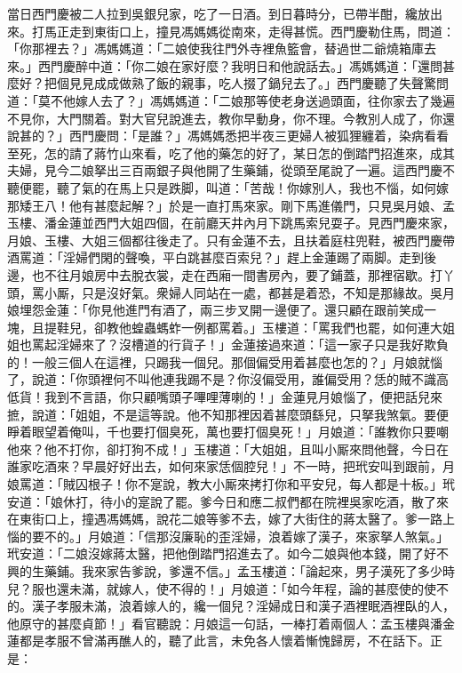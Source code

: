 當日西門慶被二人拉到吳銀兒家，吃了一日酒。到日暮時分，已帶半酣，纔放出來。打馬正走到東街口上，撞見馮媽媽從南來，走得甚慌。西門慶勒住馬，問道：「你那裡去？」馮媽媽道：「二娘使我往門外寺裡魚籃會，替過世二爺燒箱庫去來。」西門慶醉中道：「你二娘在家好麼？我明日和他說話去。」{}馮媽媽道：「還問甚麼好？把個見見成成做熟了飯的親事，吃人掇了鍋兒去了。」西門慶聽了失聲驚問道：「莫不他嫁人去了？」馮媽媽道：「二娘那等使老身送過頭面，往你家去了幾遍不見你，大門關着。對大官兒說進去，教你早動身，你不理。今教別人成了，你還說甚的？」西門慶問：「是誰？」馮媽媽悉把半夜三更婦人被狐狸纏着，染病看看至死，怎的請了蔣竹山來看，吃了他的藥怎的好了，某日怎的倒踏門招進來，成其夫婦，見今二娘拏出三百兩銀子與他開了生藥鋪，從頭至尾說了一遍。這西門慶不聽便罷，聽了氣的在馬上只是跌脚，叫道：「苦哉！你嫁別人，我也不惱，如何嫁那矮王八！他有甚麼起解？」於是一直打馬來家。剛下馬進儀門，只見吳月娘、孟玉樓、潘金蓮並西門大姐四個，在前廳天井內月下跳馬索兒耍子。見西門慶來家，月娘、玉樓、大姐三個都往後走了。只有金蓮不去，且扶着庭柱兜鞋，{}被西門慶帶酒罵道：「淫婦們閑的聲喚，{}平白跳甚麼百索兒？」趕上金蓮踢了兩脚。走到後邊，也不往月娘房中去脫衣裳，走在西廂一間書房內，要了鋪蓋，那裡宿歇。打丫頭，罵小厮，只是沒好氣。衆婦人同站在一處，都甚是着恐，不知是那緣故。吳月娘埋怨金蓮：「你見他進門有酒了，兩三步叉開一邊便了。還只顧在跟前笑成一塊，且提鞋兒，卻教他蝗蟲螞蚱一例都罵着。」玉樓道：「罵我們也罷，如何連大姐姐也罵起淫婦來了？沒槽道的行貨子！」金蓮接過來道：「這一家子只是我好欺負的！一般三個人在這裡，只踢我一個兒。那個偏受用着甚麼也怎的？」月娘就惱了，說道：「你頭裡何不叫他連我踢不是？你沒偏受用，誰偏受用？恁的賊不識高低貨！我到不言語，你只顧嘴頭子嗶哩薄喇的！」{}金蓮見月娘惱了，便把話兒來摭，說道：「姐姐，不是這等說。他不知那裡因着甚麼頭繇兒，只拏我煞氣。要便睜着眼望着俺叫，千也要打個臭死，萬也要打個臭死！」月娘道：「誰教你只要嘲他來？他不打你，卻打狗不成！」玉樓道：「大姐姐，且叫小厮來問他聲，今日在誰家吃酒來？早晨好好出去，如何來家恁個腔兒！」不一時，把玳安叫到跟前，月娘罵道：「賊囚根子！你不寔說，教大小厮來拷打你和平安兒，每人都是十板。」玳安道：「娘休打，待小的寔說了罷。爹今日和應二叔們都在院裡吳家吃酒，散了來在東街口上，撞遇馮媽媽，說花二娘等爹不去，嫁了大街住的蔣太醫了。爹一路上惱的要不的。」月娘道：「信那沒廉恥的歪淫婦，浪着嫁了漢子，來家拏人煞氣。」玳安道：「二娘沒嫁蔣太醫，把他倒踏門招進去了。如今二娘與他本錢，開了好不興的生藥鋪。我來家告爹說，爹還不信。」孟玉樓道：「論起來，男子漢死了多少時兒？服也還未滿，就嫁人，使不得的！」月娘道：「如今年程，論的甚麼使的使不的。漢子孝服未滿，浪着嫁人的，纔一個兒？淫婦成日和漢子酒裡眠酒裡臥的人，他原守的甚麼貞節！」看官聽說：月娘這一句話，一棒打着兩個人：孟玉樓與潘金蓮都是孝服不曾滿再醮人的，聽了此言，未免各人懷着慚愧歸房，不在話下。正是：

